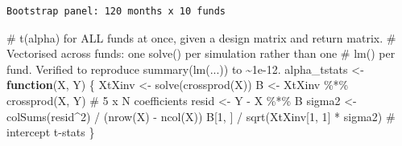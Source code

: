 \documentclass[
  letterpaper,
  DIV=11,
  numbers=noendperiod]{scrartcl}
\newenvironment{Shaded}{\begin{snugshade}}{\end{snugshade}}
\newcommand{\CommentTok}[1]{\textcolor[rgb]{0.37,0.37,0.37}{#1}}
\newcommand{\ControlFlowTok}[1]{\textcolor[rgb]{0.00,0.23,0.31}{\textbf{#1}}}
\newcommand{\DecValTok}[1]{\textcolor[rgb]{0.68,0.00,0.00}{#1}}
\newcommand{\FunctionTok}[1]{\textcolor[rgb]{0.28,0.35,0.67}{#1}}
\newcommand{\NormalTok}[1]{\textcolor[rgb]{0.00,0.23,0.31}{#1}}
\newcommand{\OtherTok}[1]{\textcolor[rgb]{0.00,0.23,0.31}{#1}}
\newcommand{\SpecialCharTok}[1]{\textcolor[rgb]{0.37,0.37,0.37}{#1}}
\begin{document}
\begin{verbatim}
Bootstrap panel: 120 months x 10 funds
\end{verbatim}

\begin{Shaded}
\begin{Highlighting}[]
\CommentTok{\# t(alpha) for ALL funds at once, given a design matrix and return matrix.}
\CommentTok{\# Vectorised across funds: one solve() per simulation rather than one}
\CommentTok{\# lm() per fund. Verified to reproduce summary(lm(...)) to \textasciitilde{}1e{-}12.}
\NormalTok{alpha\_tstats }\OtherTok{\textless{}{-}} \ControlFlowTok{function}\NormalTok{(X, Y) \{}
\NormalTok{  XtXinv }\OtherTok{\textless{}{-}} \FunctionTok{solve}\NormalTok{(}\FunctionTok{crossprod}\NormalTok{(X))}
\NormalTok{  B      }\OtherTok{\textless{}{-}}\NormalTok{ XtXinv }\SpecialCharTok{\%*\%} \FunctionTok{crossprod}\NormalTok{(X, Y)            }\CommentTok{\# 5 x N coefficients}
\NormalTok{  resid  }\OtherTok{\textless{}{-}}\NormalTok{ Y }\SpecialCharTok{{-}}\NormalTok{ X }\SpecialCharTok{\%*\%}\NormalTok{ B}
\NormalTok{  sigma2 }\OtherTok{\textless{}{-}} \FunctionTok{colSums}\NormalTok{(resid}\SpecialCharTok{\^{}}\DecValTok{2}\NormalTok{) }\SpecialCharTok{/}\NormalTok{ (}\FunctionTok{nrow}\NormalTok{(X) }\SpecialCharTok{{-}} \FunctionTok{ncol}\NormalTok{(X))}
\NormalTok{  B[}\DecValTok{1}\NormalTok{, ] }\SpecialCharTok{/} \FunctionTok{sqrt}\NormalTok{(XtXinv[}\DecValTok{1}\NormalTok{, }\DecValTok{1}\NormalTok{] }\SpecialCharTok{*}\NormalTok{ sigma2)            }\CommentTok{\# intercept t{-}stats}
\NormalTok{\}}
\end{Highlighting}
\end{Shaded}
\end{document}
